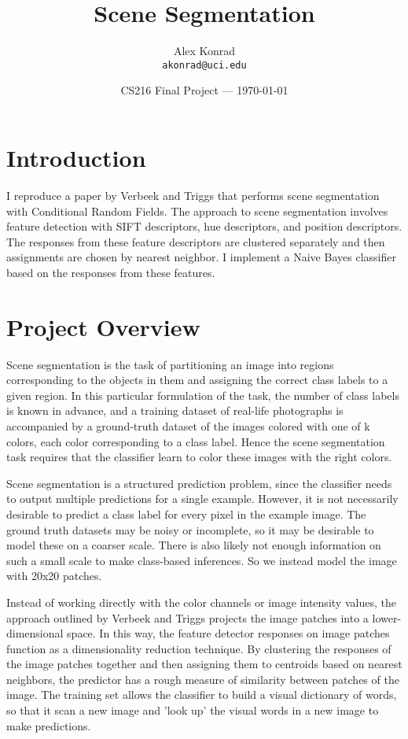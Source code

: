 \documentclass{article}
\title{Scene Segmentation}
\author{Alex Konrad\\ \texttt{akonrad@uci.edu}}
\date{CS216 Final Project --- \today}
\begin{document}
\maketitle
\section*{Introduction}

I reproduce a paper by Verbeek and Triggs \cite{VT} that performs scene segmentation with Conditional Random Fields. The approach to scene segmentation involves feature detection with SIFT descriptors, hue descriptors, and position descriptors. The responses from these feature descriptors are clustered separately and then assignments are chosen by nearest neighbor. I implement a Naive Bayes classifier based on the responses from these features.

\section{Project Overview}

Scene segmentation is the task of partitioning an image into regions
corresponding to the objects in them and assigning the correct class
labels to a given region. In this particular formulation of the task, the number of class labels is known in advance, and a training dataset of real-life photographs is accompanied by a ground-truth dataset of the images colored with one of k colors, each color corresponding to a class label. Hence the scene segmentation task requires that the classifier learn to color these images with the right colors.

Scene segmentation is a structured prediction problem, since the classifier needs to output multiple predictions for a single example. However, it is not necessarily desirable to predict a class label for every pixel in the example image. The ground truth datasets may be noisy or incomplete, so it may be desirable to model these on a coarser scale. There is also likely not enough information on such a small scale to make class-based inferences. So we instead model the image with 20x20 patches.

Instead of working directly with the color channels or image intensity values, the approach outlined by Verbeek and Triggs \cite{VT} projects the image patches into a lower-dimensional space. In this way, the feature detector responses on image patches function as a dimensionality reduction technique. By clustering the responses of the image patches together and then assigning them to centroids based on nearest neighbors, the predictor has a rough measure of similarity between patches of the image. The training set allows the classifier to build a visual dictionary of words, so that it scan a new image and 'look up' the visual words in a new image to make predictions.
\end{document}
